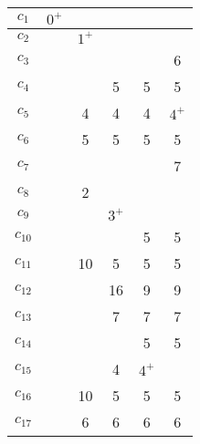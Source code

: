 \documentclass[12pt, a4paper] {ncc}
\begin{document}
\begin{enumerate}
\begin{tabular} {|c|c|c|c|c|c|}
    \hline
    $c_{1}$  &$0^+$&      &     &     &        \\ \hline
    $c_{2}$  & \z  &$1^+$ &     &     &        \\ \hline
    $c_{3}$  & \z  & \z   & \z  &\z   & 6      \\ \hline
    $c_{4}$  & \z  & \z   & 5   & 5   & 5      \\ \hline
    $c_{5}$  & \z  & 4    & 4   & 4   &$4^+$      \\ \hline
    $c_{6}$  & \z  & 5    & 5   & 5   & 5      \\ \hline
    $c_{7}$  & \z  & \z   & \z  & \z  & 7      \\ \hline
    $c_{8}$  & \z  & 2    & \z  & \z  & \z     \\ \hline
    $c_{9}$  & \z  & \z   &$3^+$&     &        \\ \hline
    $c_{10}$ & \z  & \z   & \z  & 5   & 5      \\ \hline
    $c_{11}$ & \z  & 10   &  5  & 5   & 5      \\ \hline
    $c_{12}$ & \z  & \z   & 16  & 9   & 9      \\ \hline
    $c_{13}$ & \z  & \z   & 7   & 7   & 7      \\ \hline
    $c_{14}$ & \z  & \z   & \z  & 5   & 5      \\ \hline
    $c_{15}$ & \z  & \z   & 4   &$4^+$&        \\ \hline
    $c_{16}$ & \z  & 10   & 5   & 5   & 5      \\ \hline
    $c_{17}$ & \z  & 6    & 6   & 6   & 6      \\ \hline 
\end{tabular}


\end{enumerate}
\end{document}
